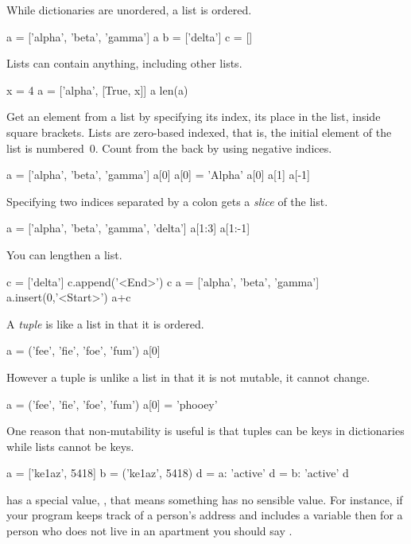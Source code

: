 While dictionaries are unordered, a \python{} list is ordered.
\begin{pythonconsole}
a = ['alpha', 'beta', 'gamma']
a
b = ['delta']
c = []
\end{pythonconsole}
Lists can contain anything, including other lists.
\begin{pythonconsole}
x = 4
a = ['alpha', [True, x]]
a
len(a)
\end{pythonconsole}
Get an element from a list by specifying its index, its place in the list,
inside square brackets.
Lists are zero-based indexed, that is, the initial element of the
list is numbered~$0$.
Count from the back by using negative indices.
\begin{pythonconsole}
a = ['alpha', 'beta', 'gamma']
a[0]
a[0] = 'Alpha'
a[0]
a[1]
a[-1]
\end{pythonconsole}
Specifying two indices separated by a colon gets a \textit{slice} 
of the list. 
\begin{pythonconsole} 
a = ['alpha', 'beta', 'gamma', 'delta']
a[1:3]
a[1:-1]
\end{pythonconsole}
You can lengthen a list.
\begin{pythonconsole}
c = ['delta']
c.append('<End>')
c
a = ['alpha', 'beta', 'gamma']
a.insert(0,'<Start>')
a+c
\end{pythonconsole}

A \textit{tuple} is like a list in that it is ordered.
\begin{pythonconsole}
a = ('fee', 'fie', 'foe', 'fum')
a[0]
\end{pythonconsole}
However a tuple is unlike a list 
in that it is not mutable, it cannot change.
\begin{pythonconsole}
a = ('fee', 'fie', 'foe', 'fum')
a[0] = 'phooey'
\end{pythonconsole}
One reason that non-mutability is useful is that 
tuples can be keys in dictionaries while lists cannot be keys.
\begin{pythonconsole}
a = ['ke1az', 5418]
b = ('ke1az', 5418)
d = {a: 'active'}
d = {b: 'active'}
d
\end{pythonconsole}

\python{} has a special value, , that
means something has no sensible value.
For instance, if your program keeps track of a person's address and
includes a variable  then   
for a person who does not live in an
apartment you should say .



